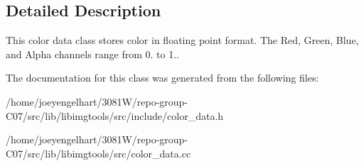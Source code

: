 \subsection{Detailed Description}
This color data class stores color in floating point format. The Red, Green, Blue, and Alpha channels range from 0. to 1.. 

The documentation for this class was generated from the following files\+:\begin{DoxyCompactItemize}
\item 
/home/joeyengelhart/3081\+W/repo-\/group-\/\+C07/src/lib/libimgtools/src/include/color\+\_\+data.\+h\item 
/home/joeyengelhart/3081\+W/repo-\/group-\/\+C07/src/lib/libimgtools/src/color\+\_\+data.\+cc\end{DoxyCompactItemize}
